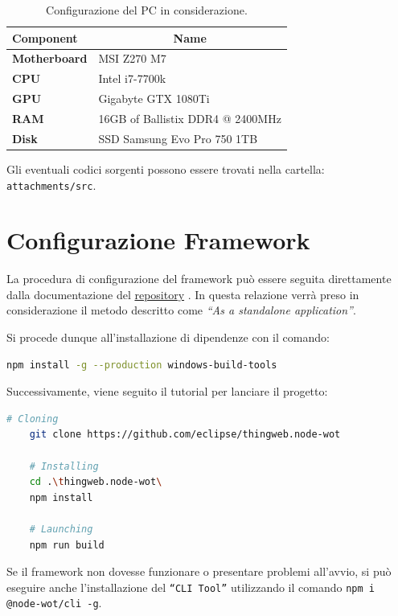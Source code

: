 \documentclass[12pt,a4paper,openright,oneside]{report}
\newcommand{\quotes}[1]{``#1''}
\begin{document}
\begin{table}[h]
	\centering
	\begin{tabular}{|l|l|}
		\hline
		\textbf{Component}   & \multicolumn{1}{c|}{\textbf{Name}} \\ \hline
		\textbf{Motherboard} & MSI Z270 M7                        \\ \hline
		\textbf{CPU}         & Intel i7-7700k                     \\ \hline
		\textbf{GPU}         & Gigabyte GTX 1080Ti                \\ \hline
		\textbf{RAM}         & 16GB of Ballistix DDR4 @ 2400MHz           \\ \hline
		\textbf{Disk}        & SSD Samsung Evo Pro 750 1TB                \\ \hline
	\end{tabular}
	\caption{\label{tab:pc-spec} Configurazione del PC in considerazione.}
\end{table}
Gli eventuali codici sorgenti possono essere trovati nella cartella:\\ \texttt{attachments/src}.

\section{Configurazione Framework}
La procedura di configurazione del framework può essere seguita direttamente dalla documentazione del \href{https://github.com/eclipse/thingweb.node-wot/}{repository} \cite{thingweb}. In questa relazione verrà preso in considerazione il metodo descritto come \textit{\quotes{As a standalone application}}.

Si procede dunque all'installazione di dipendenze con il comando:
\begin{lstlisting}[language=bash]
	npm install -g --production windows-build-tools
\end{lstlisting}

Successivamente, viene seguito il tutorial per lanciare il progetto:
\begin{lstlisting}[language=bash]
	# Cloning
	git clone https://github.com/eclipse/thingweb.node-wot
	
	# Installing
	cd .\thingweb.node-wot\
	npm install
	
	# Launching
	npm run build
\end{lstlisting}

Se il framework non dovesse funzionare o presentare problemi all'avvio, si può eseguire anche l'installazione del \texttt{\quotes{CLI Tool}} utilizzando il comando \texttt{npm i @node-wot/cli -g}. 
\end{document}
